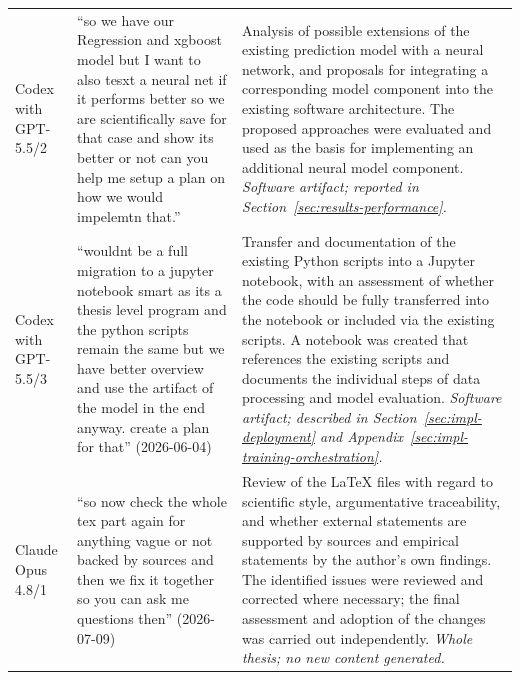 {\begin{longtable}{p{} p{} p{}}
Codex with GPT-5.5/2
& ``so we have our Regression and xgboost model but I want to also tesxt a neural net if
it performs better so we are scientifically save for that case and show its better or
not can you help me setup a plan on how we would impelemtn that.''
& Analysis of possible extensions of the existing prediction model with a neural network,
and proposals for integrating a corresponding model component into the existing software
architecture. The proposed approaches were evaluated and used as the basis for
implementing an additional neural model component. \newline
\emph{Software artifact; reported in Section~\ref{sec:results-performance}.} \\

Codex with GPT-5.5/3
& ``wouldnt be a full migration to a jupyter notebook smart as its a thesis level program
and the python scripts remain the same but we have better overview and use the artifact
of the model in the end anyway. create a plan for that'' (2026-06-04)
& Transfer and documentation of the existing Python scripts into a Jupyter notebook, with
an assessment of whether the code should be fully transferred into the notebook or
included via the existing scripts. A notebook was created that references the existing
scripts and documents the individual steps of data processing and model evaluation.
\newline \emph{Software artifact; described in Section~\ref{sec:impl-deployment} and
Appendix~\ref{sec:impl-training-orchestration}.} \\

Claude Opus 4.8/1
& ``so now check the whole tex part again for anything vague or not backed by sources
and then we fix it together so you can ask me questions then'' (2026-07-09)
& Review of the \LaTeX{} files with regard to scientific style, argumentative
traceability, and whether external statements are supported by sources and empirical
statements by the author's own findings. The identified issues were reviewed and
corrected where necessary; the final assessment and adoption of the changes was carried
out independently. \newline \emph{Whole thesis; no new content generated.} \\


\end{longtable}}
